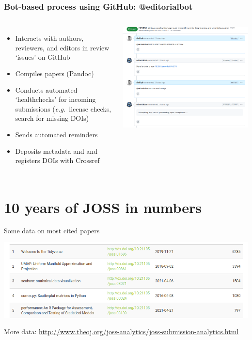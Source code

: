 \begin{frame}\frametitle{Bot-based process using GitHub: @editorialbot}

    \begin{columns}
    \begin{itemize}
        \item Interacts with authors, reviewers, and editors
in review ‘issues’ on GitHub
\item Compiles papers (Pandoc)
\item Conducts automated ‘healthchecks’ for
incoming submissions (\emph{e.g.}\ license checks,
search for missing DOIs)
\item Sends automated reminders
\item Deposits metadata and
 and 
registers DOIs with Crossref
    \end{itemize}
        
        \centering
        \includegraphics[width=\textwidth]{joss-github.png}
    \end{columns}

\end{frame}

\section{10 years of JOSS in numbers}

\begin{frame}{Some data on most cited papers}

\includegraphics[width=\linewidth]{most-cited.png}



{\tiny More data: \url{http://www.theoj.org/joss-analytics/joss-submission-analytics.html}}    
\end{frame}

